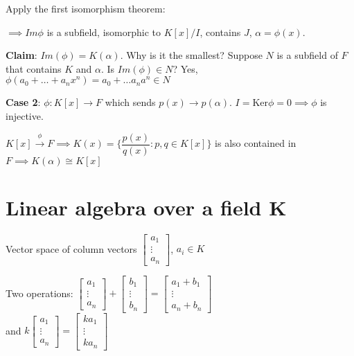 \documentclass[10pt]{article}
\newcommand{\Ker}{\text{Ker}}
\begin{document}
Apply the first isomorphism theorem:


$\implies Im\phi$ is a subfield, isomorphic to $K[x]/I$, contains $J$, $\alpha = \phi(x)$. 

\textbf{Claim}: $Im(\phi) = K(\alpha)$. Why is it the smallest?
Suppose $N$ is a subfield of $F$ that contains $K$ and $\alpha$. Is $Im(\phi) \in N$? Yes, $\phi(a_0 + \ldots + a_nx^n) = a_0 + \ldots a_na^n \in N$

\textbf{Case 2}: $\phi: K[x] \to F$ which sends $p(x) \to p(\alpha)$. $I = \Ker\phi = 0 \implies \phi$ is injective. 

$K[x] \stackrel{\phi}{\to} F \implies K(x) = \{ \dfrac{p(x)}{q(x)}: p, q \in K[x]\}$ is also contained in $F \implies K(\alpha) \cong K[x]$

\section{Linear algebra over a field K}
Vector space of column vectors $\begin{bmatrix}
    a_1\\
    \vdots\\
    a_n
\end{bmatrix}$, $a_i \in K$

Two operations: $\begin{bmatrix}
    a_1\\
    \vdots\\
    a_n
\end{bmatrix} + \begin{bmatrix}
    b_1\\
    \vdots\\
    b_n
\end{bmatrix} = \begin{bmatrix}
    a_1+b_1\\
    \vdots\\
    a_n+b_n
\end{bmatrix}$\\
and $k \begin{bmatrix}
    a_1\\
    \vdots\\
    a_n
\end{bmatrix} = \begin{bmatrix}
    ka_1\\
    \vdots\\
    ka_n
\end{bmatrix}$
\end{document}
